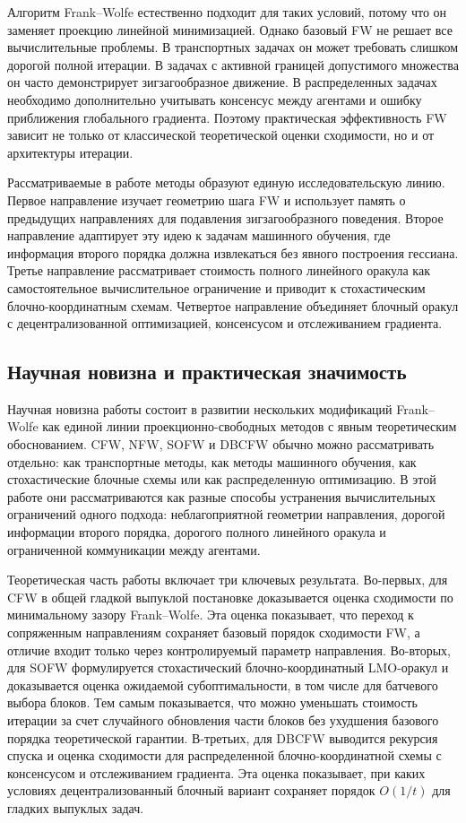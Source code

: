 Алгоритм Frank--Wolfe естественно подходит для таких условий, потому что он заменяет
проекцию линейной минимизацией.
Однако базовый FW не решает все вычислительные проблемы.
В транспортных задачах он может требовать слишком дорогой полной итерации.
В задачах с активной границей допустимого множества он часто демонстрирует зигзагообразное
движение.
В распределенных задачах необходимо дополнительно учитывать консенсус между агентами и
ошибку приближения глобального градиента.
Поэтому практическая эффективность FW зависит не только от классической теоретической
оценки сходимости, но и от архитектуры итерации.

Рассматриваемые в работе методы образуют единую исследовательскую линию.
Первое направление изучает геометрию шага FW и использует память о предыдущих направлениях
для подавления зигзагообразного поведения.
Второе направление адаптирует эту идею к задачам машинного обучения, где информация второго
порядка должна извлекаться без явного построения гессиана.
Третье направление рассматривает стоимость полного линейного оракула как самостоятельное
вычислительное ограничение и приводит к стохастическим блочно-координатным схемам.
Четвертое направление объединяет блочный оракул с децентрализованной оптимизацией,
консенсусом и отслеживанием градиента.

\subsection{Научная новизна и практическая значимость}

Научная новизна работы состоит в развитии нескольких модификаций Frank--Wolfe как единой
линии проекционно-свободных методов с явным теоретическим обоснованием.
CFW, NFW, SOFW и DBCFW обычно можно рассматривать отдельно: как транспортные методы,
как методы машинного обучения, как стохастические блочные схемы или как распределенную
оптимизацию.
В этой работе они рассматриваются как разные способы устранения вычислительных ограничений
одного подхода: неблагоприятной геометрии направления, дорогой информации второго порядка,
дорогого полного линейного оракула и ограниченной коммуникации между агентами.

Теоретическая часть работы включает три ключевых результата.
Во-первых, для CFW в общей гладкой выпуклой постановке доказывается оценка сходимости по
минимальному зазору Frank--Wolfe.
Эта оценка показывает, что переход к сопряженным направлениям сохраняет базовый порядок
сходимости FW, а отличие входит только через контролируемый параметр направления.
Во-вторых, для SOFW формулируется стохастический блочно-координатный LMO-оракул и
доказывается оценка ожидаемой субоптимальности, в том числе для батчевого выбора блоков.
Тем самым показывается, что можно уменьшать стоимость итерации за счет случайного
обновления части блоков без ухудшения базового порядка теоретической гарантии.
В-третьих, для DBCFW выводится рекурсия спуска и оценка сходимости для распределенной
блочно-координатной схемы с консенсусом и отслеживанием градиента.
Эта оценка показывает, при каких условиях децентрализованный блочный вариант сохраняет
порядок $O(1/t)$ для гладких выпуклых задач.

